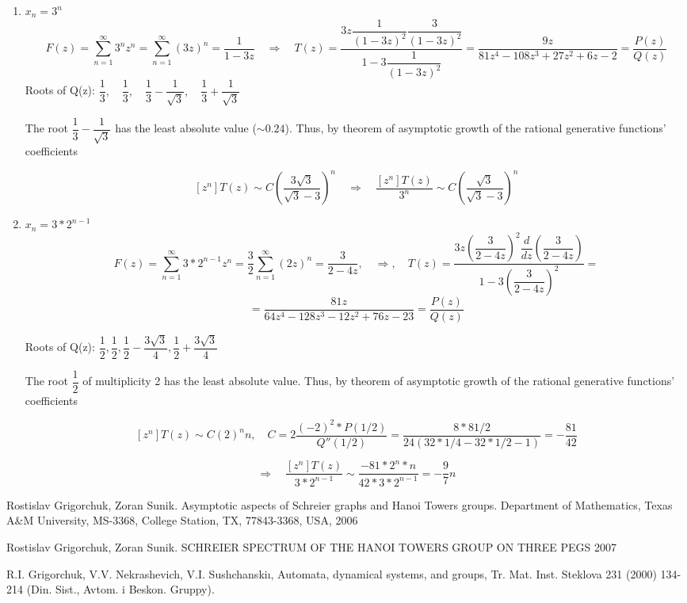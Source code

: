 \documentclass{article}
\begin{document}
\begin{enumerate}
    \item $x_n = 3^n$
    $$F(z) = \sum_{n=1}^{\infty}3^nz^n = \sum_{n=1}^{\infty}(3z)^n = \dfrac{1}{1 - 3z} \quad \Rightarrow \quad T(z) = \dfrac{3z\dfrac{1}{(1 - 3z)^2} \dfrac{3}{(1 - 3z)^2}}{1 - 3\dfrac{1}{(1 - 3z)^2}} = \dfrac{9z}{81z^4 - 108z^3 + 27z^2+6z - 2} = \dfrac{P(z)}{Q(z)}$$
    Roots of Q(z): $\dfrac{1}{3}, \quad \dfrac{1}{3}, \quad \dfrac{1}{3} - \dfrac{1}{\sqrt{3}}, \quad \dfrac{1}{3} + \dfrac{1}{\sqrt{3}}$

    The root $\dfrac{1}{3} - \dfrac{1}{\sqrt{3}}$ has the least absolute value ($\sim0.24$). Thus, by theorem of asymptotic growth of the rational generative functions' coefficients

    $$[z^n] T(z) \sim C \left(\dfrac{3\sqrt{3}}{\sqrt{3} - 3}\right)^n \quad \Rightarrow \quad \dfrac{[z^n]T(z)}{3^n} \sim C \left(\dfrac{\sqrt{3}}{\sqrt{3} - 3}\right)^n$$

    \item $x_n = 3 * 2^{n-1}$
    $$F(z) = \sum_{n=1}^{\infty}3*2^{n-1}z^n = \frac{3}{2} \sum_{n=1}^{\infty}(2z)^n = \dfrac{3}{2 - 4z}, \quad \Rightarrow, \quad T(z) = \dfrac{3z \left(\dfrac{3}{2 - 4z}\right)^2 \dfrac{d}{dz}\left(\dfrac{3}{2 - 4z}\right)}{1 - 3\left(\dfrac{3}{2 - 4z}\right)^2} =$$
    $$=\dfrac{81z}{64z^4 - 128z^3 - 12z^2 + 76z - 23} = \dfrac{P(z)}{Q(z)}$$

    Roots of Q(z): $\dfrac{1}{2}, \dfrac{1}{2}, \dfrac{1}{2} - \dfrac{3\sqrt{3}}{4}, \dfrac{1}{2} + \dfrac{3\sqrt{3}}{4}$

    The root $\dfrac{1}{2}$ of multiplicity 2 has the least absolute value. Thus, by theorem of asymptotic growth of the rational generative functions' coefficients

    $$[z^n]T(z) \sim C(2)^n n, \quad C = 2 \dfrac{(-2)^2 * P(1/2)}{Q''(1/2)} = \dfrac{8 * 81/2}{24(32*1/4 - 32*1/2 - 1)} = -\dfrac{81}{42}$$

    $$\Rightarrow \quad \dfrac{[z^n]T(z)}{3*2^{n-1}} \sim \dfrac{-81 * 2^n * n}{42 * 3 * 2^{n-1}} = -\dfrac{9}{7}n$$



\end{enumerate}

\begin{thebibliography}{9}
	Rostislav Grigorchuk, Zoran Sunik. Asymptotic aspects of Schreier graphs and Hanoi Towers groups. Department of Mathematics, Texas A\&M University, MS-3368, College Station, TX, 77843-3368, USA, 2006
	
	Rostislav Grigorchuk, Zoran Sunik. SCHREIER SPECTRUM OF THE HANOI TOWERS GROUP ON THREE PEGS 2007
	
	R.I. Grigorchuk, V.V. Nekrashevich, V.I. Sushchanskiı, Automata, dynamical systems, and groups, Tr. Mat. Inst. Steklova 231 (2000) 134-214
	(Din. Sist., Avtom. i Beskon. Gruppy).
\end{thebibliography}
\end{document}

